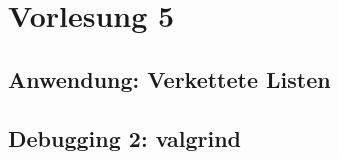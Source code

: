\section{Vorlesung 5}

\setcounter{minutecounter}{0}

\subsection{Anwendung: Verkettete Listen}

\subsection{Debugging 2: valgrind}

\iflecturer
\begin{framed}
\end{framed}
\fi


